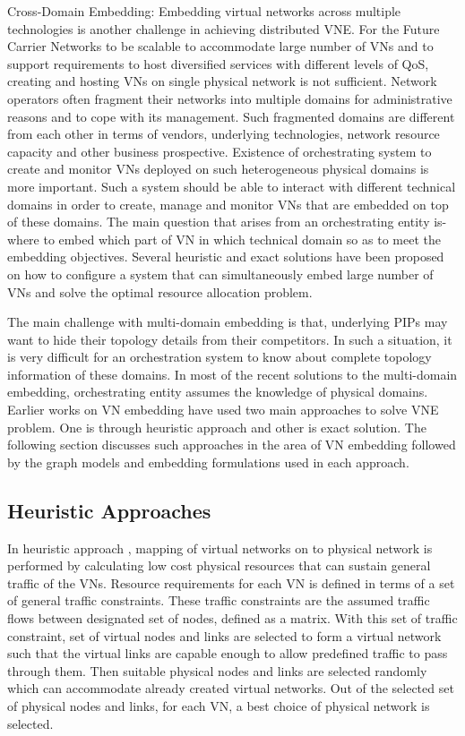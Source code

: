 \documentclass[article,dr=phil,type=msc ,colorback,accentcolor=tud4b]{tudthesis}
\begin{document}
Cross-Domain Embedding: Embedding virtual networks across multiple technologies is another challenge in achieving distributed VNE. For the Future Carrier Networks to be scalable to accommodate large number of VNs and to support requirements to host diversified services with different levels of QoS, creating and hosting VNs on single physical network is not sufficient. Network operators often fragment their networks into multiple domains for administrative reasons and to cope with its management. Such fragmented domains are different from each other in terms of vendors, underlying technologies, network resource capacity and other business prospective. Existence of orchestrating system to create and monitor VNs deployed on such heterogeneous physical domains is more important. Such a system should be able to interact with different technical domains in order to create, manage and monitor VNs that are embedded on top of these domains. The main question that arises from an orchestrating entity is- where to embed which part of VN in which technical domain so as to meet the embedding objectives. Several heuristic and exact solutions \cite{vne_survey} have been proposed on how to configure a system that can simultaneously embed large number of VNs and solve the optimal resource allocation problem.\newline 

The main challenge with multi-domain embedding is that, underlying PIPs may want to hide their topology details from their competitors. In such a situation, it is very difficult for an orchestration system to know about complete topology information of these domains. In most of the recent solutions to the multi-domain embedding, orchestrating entity assumes the knowledge of physical domains. Earlier works on VN embedding have used two main approaches to solve VNE problem. One is through heuristic approach and other is exact solution. The following section discusses such approaches in the area of VN embedding followed by the graph models and embedding formulations used in each approach. 
\subsection{Heuristic Approaches} 
In heuristic approach \cite{h1}, mapping of virtual networks on to physical network is performed by calculating low cost physical resources that can sustain general traffic of the VNs. Resource requirements for each VN is defined in terms of a set of general traffic constraints. These traffic constraints are the assumed traffic flows between designated set of nodes, defined as a matrix. With this set of traffic constraint, set of virtual nodes and links are selected to form a virtual network such that the virtual links are capable enough to allow predefined traffic to pass through them. Then suitable physical nodes and links are selected randomly which can accommodate already created virtual networks. Out of the selected set of physical nodes and links, for each VN, a best choice of physical network is selected. \newline
\end{document}
